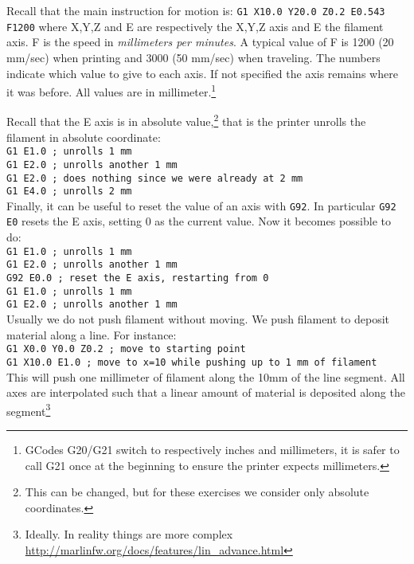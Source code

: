 \documentclass{article}
\begin{document}
Recall that the main instruction for motion is:
\texttt{G1 X10.0 Y20.0 Z0.2 E0.543 F1200}
where X,Y,Z and E are respectively the X,Y,Z axis and E the filament axis. F is the speed in \textit{millimeters per minutes}. A typical value of F is 1200 (20 mm/sec) when printing and 3000 (50 mm/sec) when traveling. The numbers indicate which value to give to each axis. If not specified the axis remains where it was before. All values are in millimeter.\footnote{GCodes G20/G21 switch to respectively inches and millimeters, it is safer to call G21 once at the beginning to ensure the printer expects millimeters.}

Recall that the E axis is in absolute value,\footnote{This can be changed, but for these exercises we consider only absolute coordinates.} that is the printer unrolls the filament in absolute coordinate:\\
\texttt{G1 E1.0 ; unrolls 1 mm}\\
\texttt{G1 E2.0 ; unrolls another 1 mm}\\
\texttt{G1 E2.0 ; does nothing since we were already at 2 mm}\\
\texttt{G1 E4.0 ; unrolls 2 mm}\\

Finally, it can be useful to reset the value of an axis with \texttt{G92}. 
In particular \texttt{G92 E0} resets the E axis, setting 0 as the current value. Now it becomes
possible to do:\\
\texttt{G1 E1.0 ; unrolls 1 mm}\\
\texttt{G1 E2.0 ; unrolls another 1 mm}\\
\texttt{G92 E0.0 ; reset the E axis, restarting from 0}\\
\texttt{G1 E1.0 ; unrolls 1 mm}\\
\texttt{G1 E2.0 ; unrolls another 1 mm}\\

Usually we do not push filament without moving. We push filament to deposit material along a line.
For instance:\\
\texttt{G1 X0.0 Y0.0 Z0.2 ; move to starting point}\\
\texttt{G1 X10.0 E1.0 ; move to x=10 while pushing up to 1 mm of filament}\\
This will push one millimeter of filament along the 10mm of the line segment. All axes are interpolated such that a linear amount of material is deposited along the segment\footnote{Ideally. In reality things are more complex \url{http://marlinfw.org/docs/features/lin_advance.html}}
\end{document}

